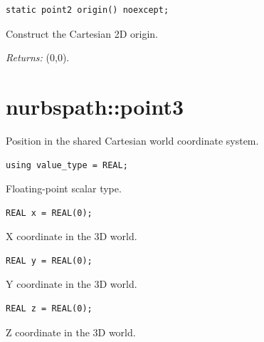 \par\noindent\begin{minipage}{\linewidth}
\begin{lstlisting}[style=apireference]
static point2 origin() noexcept;
\end{lstlisting}
{\footnotesize Construct the Cartesian 2D origin.\par}
{\footnotesize\textit{Returns:} (0,0).\par}
\end{minipage}\par\vspace{1pt}
\section{nurbspath::point3}
Position in the shared Cartesian world coordinate system.
\par\noindent\begin{minipage}{\linewidth}
\begin{lstlisting}[style=apireference]
using value_type = REAL;
\end{lstlisting}
{\footnotesize Floating-point scalar type.\par}
\end{minipage}\par\vspace{1pt}
\par\noindent\begin{minipage}{\linewidth}
\begin{lstlisting}[style=apireference]
REAL x = REAL(0);
\end{lstlisting}
{\footnotesize X coordinate in the 3D world.\par}
\end{minipage}\par\vspace{1pt}
\par\noindent\begin{minipage}{\linewidth}
\begin{lstlisting}[style=apireference]
REAL y = REAL(0);
\end{lstlisting}
{\footnotesize Y coordinate in the 3D world.\par}
\end{minipage}\par\vspace{1pt}
\par\noindent\begin{minipage}{\linewidth}
\begin{lstlisting}[style=apireference]
REAL z = REAL(0);
\end{lstlisting}
{\footnotesize Z coordinate in the 3D world.\par}
\end{minipage}\par\vspace{1pt}
